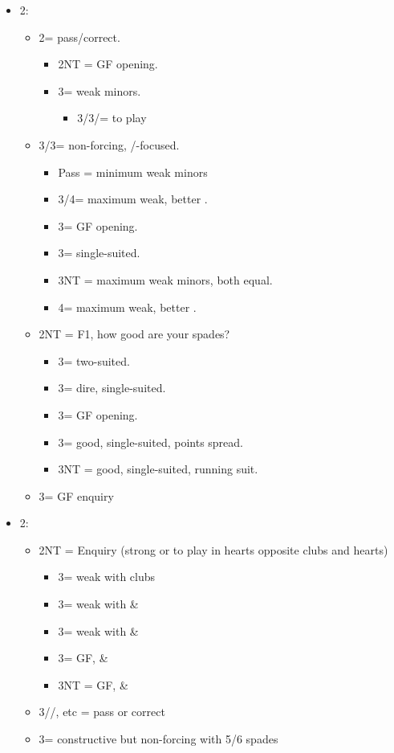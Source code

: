 \documentclass[a4paper,14pt]{extarticle}
\begin{document}
\begin{itemize}
\item 2\hearts:
	\begin{itemize}
   \item 2\spades = pass/correct.
		\begin{itemize}
      \item 2NT = GF opening.
      \item 3\clubs = weak minors.
			\begin{itemize}
			\item 3\diamonds/3\hearts/\spades = to play
			\end{itemize}
		\end{itemize}
   \item 3\clubs/3\diamonds = non-forcing, \clubs/\diamonds-focused.
		\begin{itemize}
		\item Pass = minimum weak minors
      \item 3/4\diamonds = maximum weak, better \diamonds.
      \item 3\hearts = GF opening.
      \item 3\spades = single-suited.
      \item 3NT = maximum weak minors, both equal.
      \item 4\clubs = maximum weak, better \clubs.
		\end{itemize}
   \item 2NT = F1, how good are your spades?
		\begin{itemize}
      \item 3\clubs = two-suited.
      \item 3\diamonds = dire, single-suited.
      \item 3\hearts = GF opening.
      \item 3\spades = good, single-suited, points spread.
      \item 3NT = good, single-suited, running suit.
		\end{itemize}
	\item 3\hearts = GF enquiry
	\end{itemize}

\newpage

\item 2\spades:
	\begin{itemize}
   \item 2NT = Enquiry (strong or to play in hearts opposite clubs and hearts)
		\begin{itemize}
      \item 3\clubs = weak with clubs
      \item 3\diamonds = weak with \hearts\&\diamonds
      \item 3\hearts = weak with \hearts\&\clubs
      \item 3\spades = GF, \hearts\&\clubs
      \item 3NT = GF, \hearts\&\diamonds
		\end{itemize}
   \item 3\clubs/\diamonds/\hearts, etc = pass or correct
   \item 3\spades = constructive but non-forcing with 5/6 spades
	\end{itemize}


\end{itemize}
\end{document}
